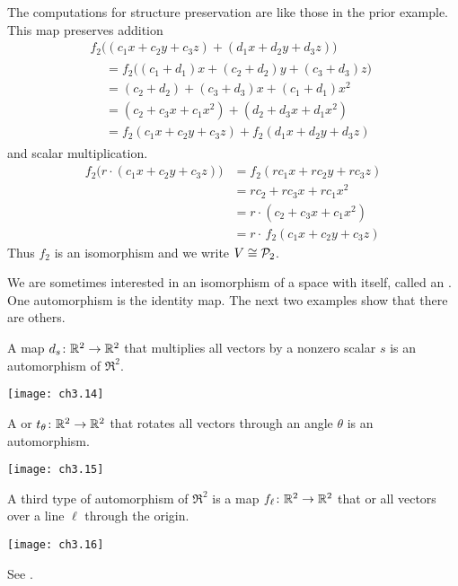 \begin{example}
The computations for structure preservation are like those 
in the prior example.
This map preserves addition
\begin{multline*}
  f_2\bigl((c_1x+c_2y+c_3z)
        +(d_1x+d_2y+d_3z)\bigr)       \\
 \begin{aligned}
  &=f_2\bigl((c_1+d_1)x+(c_2+d_2)y+(c_3+d_3)z\bigr)   \\
  &=(c_2+d_2)+(c_3+d_3)x+(c_1+d_1)x^2   \\
  &=(c_2+c_3x+c_1x^2)+(d_2+d_3x+d_1x^2)   \\
  &=f_2(c_1x+c_2y+c_3z)+f_2(d_1x+d_2y+d_3z)
 \end{aligned}
\end{multline*}
and scalar multiplication.
\begin{align*}
  f_2\bigl(r\cdot(c_1x+c_2y+c_3z)\bigr)
  &=f_2(rc_1x+rc_2y+rc_3z)   \\
  &=rc_2+rc_3x+rc_1x^2   \\
  &=r\cdot(c_2+c_3x+c_1x^2)   \\
  &=r\cdot\, f_2(c_1x+c_2y+c_3z)
\end{align*}
Thus $f_2$ is an isomorphism and we write $V\cong\mathcal{P}_2$.
\end{example}

We are sometimes interested in an isomorphism of a space with itself,
called an %
.
One automorphism is the identity map.
The next two examples show that there are others.

\begin{example} \label{exam:RigidPlaneMapsAutos}
A 
map $\mbox{$d_s\colon \mathbb{R}^2\to \mathbb{R}^2$}$ that multiplies all vectors by a nonzero
scalar $s$ is an automorphism of $\Re^2$.
\begin{center} \small
  \texttt{[image: ch3.14]}                                
\end{center}
A %
or  $\mbox{$t_{\theta}\colon \mathbb{R}^2\to \mathbb{R}^2$}$
that rotates all vectors through an angle $\theta$ is an automorphism.
\begin{center} \small
  \texttt{[image: ch3.15]}                                
\end{center}
A third type of automorphism of $\Re^2$ is a map 
$\mbox{$f_\ell\colon \mathbb{R}^2\to \mathbb{R}^2$}$ that 
or %
all vectors over a line $\ell$ through the origin.
\begin{center} \small
  \texttt{[image: ch3.16]}                                
\end{center}
See .
\end{example}

